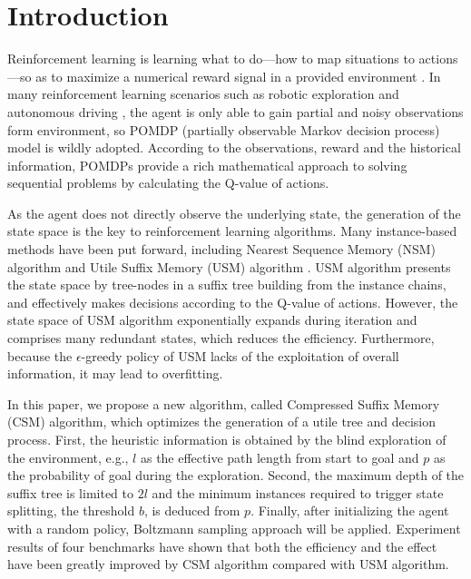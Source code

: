 \documentclass[conference]{IEEEtran}
\begin{document}
	
	\section{Introduction}
	
	Reinforcement learning is learning what to do—how to map situations to actions—so
	as to maximize a numerical reward signal in a provided environment
	\cite{sutton2018reinforcement}. In many reinforcement learning scenarios such as
	robotic exploration \cite{smith2007probabilistic} and autonomous driving
	\cite{bai2015intention}, the agent is only able to gain partial and noisy
	observations form environment, so POMDP (partially observable Markov decision
	process) model is wildly adopted. According to the observations, reward and the
	historical information, POMDPs provide a rich mathematical approach to solving
	sequential problems by calculating the Q-value of actions.
	
	As the agent does not directly observe the underlying state, the generation of
	the state space is the key to reinforcement learning algorithms.
	Many instance-based methods have been put forward, including Nearest Sequence
	Memory (NSM) algorithm \cite{mccallum1997reinforcement} and Utile Suffix Memory
	(USM) algorithm \cite{mccallum1995instance}. USM algorithm presents the state space by
	tree-nodes in a suffix tree building from the instance chains, and effectively
	makes decisions according to the Q-value of actions. However, the state space of USM
	algorithm exponentially expands during iteration and comprises many redundant
	states, which reduces the efficiency. Furthermore, because the $\epsilon$-greedy
	policy of USM lacks of the exploitation of overall information, it may lead to
	overfitting.
	
	In this paper, we propose a new algorithm, called Compressed Suffix Memory (CSM)
	algorithm, which optimizes the generation of a utile tree and decision process.
	First, the heuristic information is obtained by the blind exploration
	of the environment, e.g., $l$ as the effective path length from start to goal
	and $p$ as the probability of goal during the exploration. Second, the maximum
	depth of the suffix tree is limited to $2l$ and the minimum instances required
	to trigger state splitting, the threshold $b$, is deduced from $p$. Finally, after initializing the agent
	with a random policy, Boltzmann sampling approach will be applied. Experiment
	results of four benchmarks have shown that both the efficiency and the effect
	have been greatly improved by CSM algorithm compared with USM algorithm.
	
\end{document}
